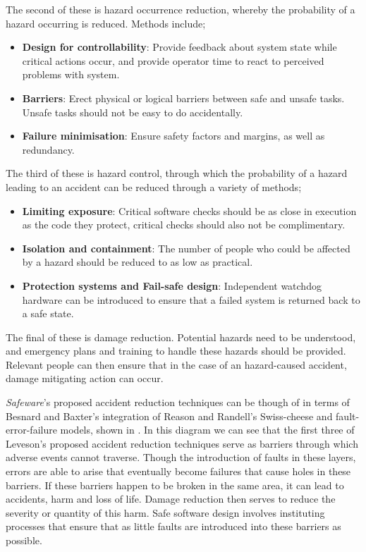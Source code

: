 \documentclass{cshonours}
\begin{document}
The second of these is hazard occurrence reduction, whereby the probability of a hazard occurring is reduced. Methods include;
 \begin{itemize}
  \item \textbf{Design for controllability}: Provide feedback about system state while critical actions occur, and provide operator time to react to perceived problems with system.
  \item \textbf{Barriers}: Erect physical or logical barriers between safe and unsafe tasks. Unsafe tasks should not be easy to do accidentally.
  \item \textbf{Failure minimisation}: Ensure safety factors and margins, as well as redundancy.
 \end{itemize}
 
The third of these is hazard control, through which the probability of a hazard leading to an accident can be reduced through a variety of methods;
 \begin{itemize}
  \item \textbf{Limiting exposure}: Critical software checks should be as close in execution as the code they protect, critical checks should also not be complimentary.
  \item \textbf{Isolation and containment}: The number of people who could be affected by a hazard should be reduced to as low as practical.
  \item \textbf{Protection systems and Fail-safe design}: Independent watchdog hardware can be introduced to ensure that a failed system is returned back to a safe state.
 \end{itemize}

The final of these is damage reduction. Potential hazards need to be understood, and emergency plans and training to handle these hazards should be provided. Relevant people can then ensure that in the case of an hazard-caused accident, damage mitigating action can occur.

\textit{Safeware}'s proposed accident reduction techniques can be though of in terms of Besnard and Baxter's \cite{besnard2003human} integration of Reason and Randell's Swiss-cheese and fault-error-failure models, shown in . In this diagram we can see that the first three of Leveson's proposed accident reduction techniques serve as barriers through which adverse events cannot traverse. Though the introduction of faults in these layers, errors are able to arise that eventually become failures that cause holes in these barriers. If these barriers happen to be broken in the same area, it can lead to accidents, harm and loss of life. Damage reduction then serves to reduce the severity or quantity of this harm. Safe software design involves instituting processes that ensure that as little faults are introduced into these barriers as possible.
\end{document}
